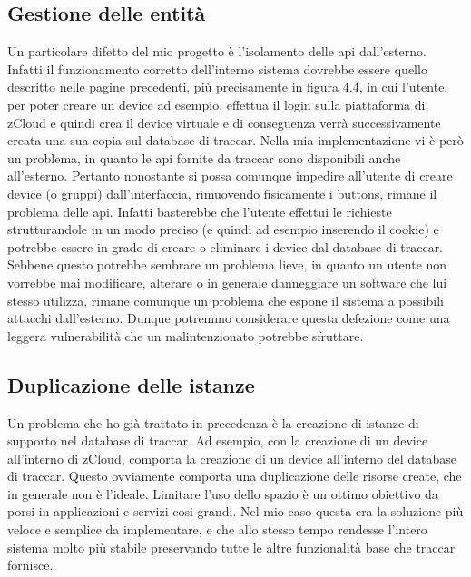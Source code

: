 \documentclass[a4paper,titlepage,12pt]{book}
\begin{document}
{\subsection{
Gestione delle entità}
Un particolare difetto del mio progetto è l'isolamento delle api dall'esterno. Infatti il funzionamento corretto dell'interno sistema dovrebbe essere quello descritto nelle pagine precedenti, più precisamente in figura 4.4, in cui l'utente, per poter creare un device ad esempio, effettua il login sulla piattaforma di zCloud e quindi crea il device virtuale e di conseguenza verrà successivamente creata una sua copia sul database di traccar. Nella mia implementazione vi è però un problema, in quanto le api fornite da traccar sono disponibili anche all'esterno. Pertanto nonostante si possa comunque impedire all'utente di creare device (o gruppi) dall'interfaccia, rimuovendo fisicamente i buttons, rimane il problema delle api. Infatti basterebbe che l'utente effettui le richieste strutturandole in un modo preciso (e quindi ad esempio inserendo il cookie) e potrebbe essere in grado di creare o eliminare i device dal database di traccar.\\
Sebbene questo potrebbe sembrare un problema lieve, in quanto un utente non vorrebbe mai modificare, alterare o in generale danneggiare un software che lui stesso utilizza, rimane comunque un problema che espone il sistema a possibili attacchi dall'esterno. Dunque potremmo considerare questa defezione come una leggera vulnerabilità che un malintenzionato potrebbe sfruttare.


\subsection{
Duplicazione delle istanze}
Un problema che ho già trattato in precedenza è la creazione di istanze di supporto nel database di traccar. Ad esempio, con la creazione di un device all'interno di zCloud, comporta la creazione di un device all'interno del database di traccar. Questo ovviamente comporta una duplicazione delle risorse create, che in generale non è l'ideale. Limitare l'uso dello spazio è un ottimo obiettivo da porsi in applicazioni e servizi cosi grandi. Nel mio caso questa era la soluzione più veloce e semplice da implementare, e che allo stesso tempo rendesse l'intero sistema molto più stabile preservando tutte le altre funzionalità base che traccar fornisce.


}
\end{document}
